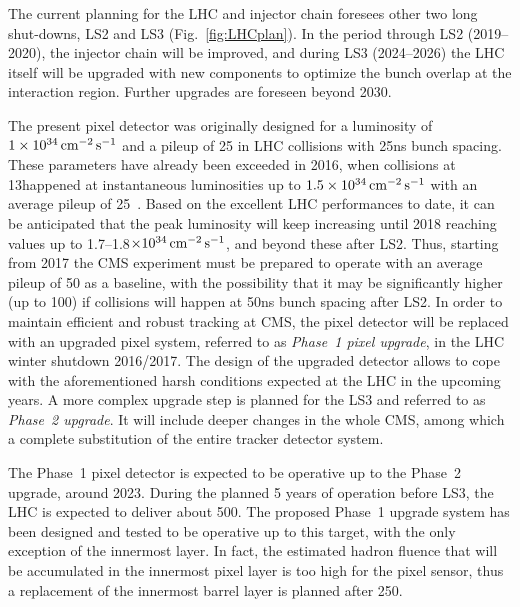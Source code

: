 The current planning for the LHC and injector chain foresees other two long shut-downs, LS2 and LS3 (Fig.~\ref{fig:LHCplan}).
In the period through LS2 (2019--2020), the injector chain will be improved,
and during LS3 (2024--2026) the LHC itself will be upgraded with new components to optimize the bunch overlap at the interaction region. 
Further upgrades are foreseen beyond 2030.

The present pixel detector was originally designed for a luminosity of $1\times10^{34}\,\text{cm}^\text{$-$2}\,\text{s}^\text{$-$1}$ and a pileup of 25 in LHC collisions with 25\unit{ns} bunch spacing.
These parameters have already been exceeded in 2016, when collisions at 13\TeV happened at instantaneous luminosities up to $1.5\times10^{34}\,\text{cm}^\text{$-$2}\,\text{s}^\text{$-$1}$ with an average pileup of 25~\cite{LumiPublicResults}.
Based on the excellent LHC performances to date, it can be anticipated that the peak luminosity will keep increasing until 2018 reaching values up to 1.7--1.8$\times10^{34}\,\text{cm}^\text{$-$2}\,\text{s}^\text{$-$1}$, and beyond these after LS2.
Thus, starting from 2017 the CMS experiment must be prepared to operate with an average pileup of 50 as a baseline,
with the possibility that it may be significantly higher (up to 100) if collisions will happen at 50\unit{ns} bunch spacing after LS2.
In order to maintain efficient and robust tracking at CMS, the pixel detector will be replaced with an upgraded pixel system, referred to as {\it Phase~1 pixel upgrade}, in the LHC winter shutdown 2016/2017.
The design of the upgraded detector allows to cope with the aforementioned harsh conditions expected at the LHC in the upcoming years.
A more complex upgrade step is planned for the LS3 and referred to as {\it Phase~2 upgrade}. It will include deeper changes in the whole CMS, among which a complete substitution of the entire tracker detector system.

The Phase~1 pixel detector is expected to be operative up to the Phase~2 upgrade, around 2023.
During the planned 5 years of operation before LS3, the LHC is expected to deliver about 500\fbinv.
The proposed Phase~1 upgrade system has been designed and tested to be operative up to this target, with the only exception of the innermost layer.
In fact, the estimated hadron fluence that will be accumulated in the innermost pixel layer is too high for the pixel sensor, thus a replacement of the innermost barrel layer is planned after 250\fbinv.

